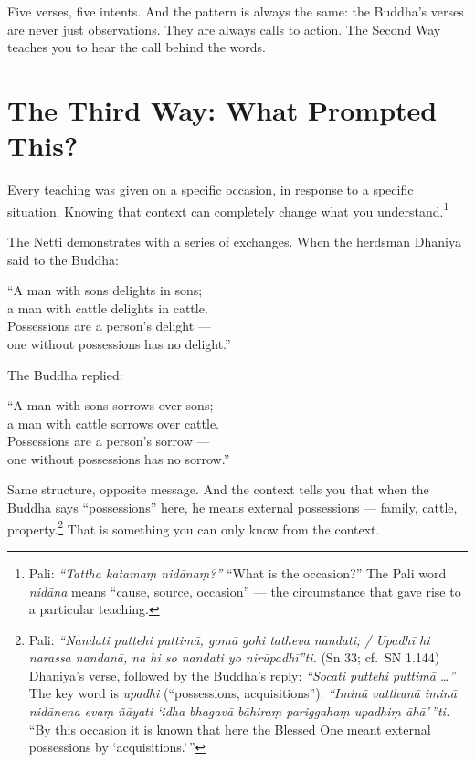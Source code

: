 Five verses, five intents. And the pattern is always the same: the Buddha's verses are never just observations. They are always calls to action. The Second Way teaches you to hear the call behind the words.

\section*{The Third Way: What Prompted This?}

Every teaching was given on a specific occasion, in response to a specific situation. Knowing that context can completely change what you understand.\footnote{Pali: \textit{``Tattha katamaṃ nidānaṃ?''} ``What is the occasion?'' The Pali word \textit{nidāna} means ``cause, source, occasion'' --- the circumstance that gave rise to a particular teaching.}

The Netti demonstrates with a series of exchanges. When the herdsman Dhaniya said to the Buddha:

\begin{versebox}
``A man with sons delights in sons;\\
a man with cattle delights in cattle.\\
Possessions are a person's delight ---\\
one without possessions has no delight.''
\end{versebox}

The Buddha replied:

\begin{versebox}
``A man with sons sorrows over sons;\\
a man with cattle sorrows over cattle.\\
Possessions are a person's sorrow ---\\
one without possessions has no sorrow.''
\end{versebox}

Same structure, opposite message. And the context tells you that when the Buddha says ``possessions'' here, he means external possessions --- family, cattle, property.\footnote{Pali: \textit{``Nandati puttehi puttimā, gomā gohi tatheva nandati; / Upadhī hi narassa nandanā, na hi so nandati yo nirūpadhī''ti.} (Sn 33; cf.\ SN 1.144) Dhaniya's verse, followed by the Buddha's reply: \textit{``Socati puttehi puttimā \ldots''} The key word is \textit{upadhi} (``possessions, acquisitions''). \textit{``Iminā vatthunā iminā nidānena evaṃ ñāyati `idha bhagavā bāhiraṃ pariggahaṃ upadhiṃ āhā'\,''ti.} ``By this occasion it is known that here the Blessed One meant external possessions by `acquisitions.'\,''} That is something you can only know from the context.

